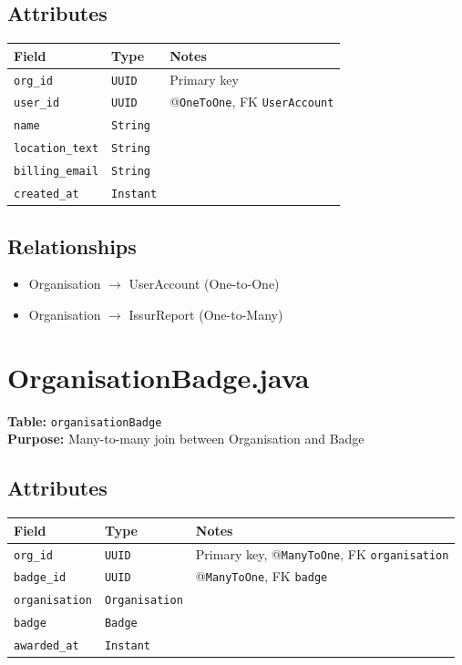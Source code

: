 \documentclass[a4paper,11pt]{article}
\begin{document}
\subsection*{Attributes}
\begin{longtable}{|p{4cm}|p{3cm}|p{6cm}|}
\hline
\textbf{Field} & \textbf{Type} & \textbf{Notes} \\
\hline
\texttt{org\_id} & \texttt{UUID} & Primary key \\
\texttt{user\_id} & \texttt{UUID} & @\texttt{OneToOne}, FK \texttt{UserAccount}\\
\texttt{name} & \texttt{String} & \\
\texttt{location\_text} & \texttt{String} &  \\
\texttt{billing\_email} & \texttt{String} &  \\
\texttt{created\_at} & \texttt{Instant} & \\
\hline



\end{longtable}

\subsection*{Relationships}
\begin{itemize}
  \item Organisation $\rightarrow$ UserAccount (One-to-One)
  \item Organisation $\rightarrow$ IssurReport (One-to-Many)


\end{itemize}


\section{OrganisationBadge.java}

\textbf{Table:} \texttt{organisationBadge} \\
\textbf{Purpose:} Many-to-many join between Organisation and Badge \\

\subsection*{Attributes}
\begin{longtable}{|p{4cm}|p{3cm}|p{6cm}|}
\hline
\textbf{Field} & \textbf{Type} & \textbf{Notes} \\
\hline
\texttt{org\_id} & \texttt{UUID} & Primary key, @\texttt{ManyToOne}, FK \texttt{organisation} \\
\texttt{badge\_id} & \texttt{UUID} & @\texttt{ManyToOne}, FK \texttt{badge} \\
\texttt{organisation} & \texttt{Organisation} & \\
\texttt{badge} & \texttt{Badge} &  \\
\texttt{awarded\_at} & \texttt{Instant} &  \\
\hline
\end{longtable}
\end{document}
